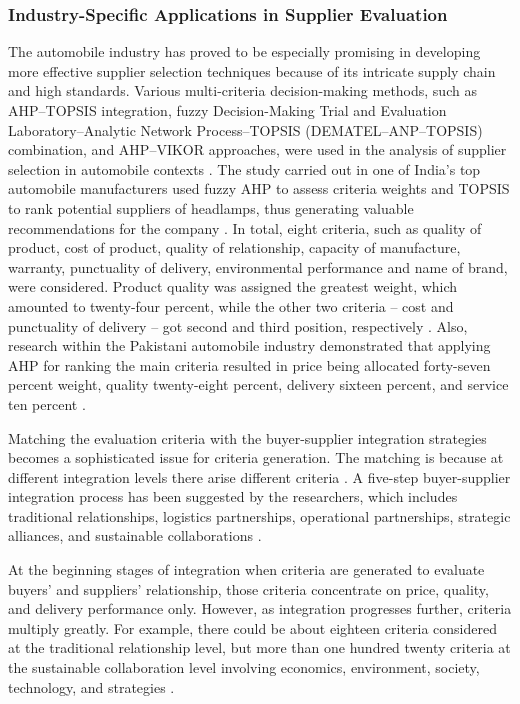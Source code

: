 \documentclass[11pt]{article}
\begin{document}
\subsubsection{Industry-Specific Applications in Supplier Evaluation}

The automobile industry has proved to be especially promising in developing more effective supplier selection techniques because of its intricate supply chain and high standards. Various multi-criteria decision-making methods, such as AHP--TOPSIS integration, fuzzy Decision-Making Trial and Evaluation Laboratory--Analytic Network Process--TOPSIS (DEMATEL--ANP--TOPSIS) combination, and AHP--VIKOR approaches, were used in the analysis of supplier selection in automobile contexts \cite{ref13,ref27,ref31}. The study carried out in one of India's top automobile manufacturers used fuzzy AHP to assess criteria weights and TOPSIS to rank potential suppliers of headlamps, thus generating valuable recommendations for the company \cite{ref25}. In total, eight criteria, such as quality of product, cost of product, quality of relationship, capacity of manufacture, warranty, punctuality of delivery, environmental performance and name of brand, were considered. Product quality was assigned the greatest weight, which amounted to twenty-four percent, while the other two criteria -- cost and punctuality of delivery -- got second and third position, respectively \cite{ref25}. Also, research within the Pakistani automobile industry demonstrated that applying AHP for ranking the main criteria resulted in price being allocated forty-seven percent weight, quality twenty-eight percent, delivery sixteen percent, and service ten percent \cite{ref13}.



Matching the evaluation criteria with the buyer-supplier integration strategies becomes a sophisticated issue for criteria generation. The matching is because at different integration levels there arise different criteria \cite{ref31}. A five-step buyer-supplier integration process has been suggested by the researchers, which includes traditional relationships, logistics partnerships, operational partnerships, strategic alliances, and sustainable collaborations \cite{ref30}.

At the beginning stages of integration when criteria are generated to evaluate buyers' and suppliers' relationship, those criteria concentrate on price, quality, and delivery performance only. However, as integration progresses further, criteria multiply greatly. For example, there could be about eighteen criteria considered at the traditional relationship level, but more than one hundred twenty criteria at the sustainable collaboration level involving economics, environment, society, technology, and strategies \cite{ref30}.
\end{document}
